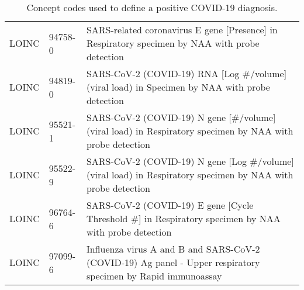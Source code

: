 \begin{table}[ht]
\begin{tabular}{lll}
  LOINC & 94758-0 & SARS-related coronavirus E gene [Presence] in Respiratory specimen by NAA with probe detection \\ 
  LOINC & 94819-0 & SARS-CoV-2 (COVID-19) RNA [Log \#/volume] (viral load) in Specimen by NAA with probe detection \\ 
  LOINC & 95521-1 & SARS-CoV-2 (COVID-19) N gene [\#/volume] (viral load) in Respiratory specimen by NAA with probe detection \\ 
  LOINC & 95522-9 & SARS-CoV-2 (COVID-19) N gene [Log \#/volume] (viral load) in Respiratory specimen by NAA with probe detection \\ 
  LOINC & 96764-6 & SARS-CoV-2 (COVID-19) E gene [Cycle Threshold \#] in Respiratory specimen by NAA with probe detection \\ 
  LOINC & 97099-6 & Influenza virus A and B and SARS-CoV-2 (COVID-19) Ag panel - Upper respiratory specimen by Rapid immunoassay \\ 
   \hline
\end{tabular}
\caption{Concept codes used to define a positive COVID-19 diagnosis.} 
\label{tab:codes_positive_diagnosis}
\end{table}
